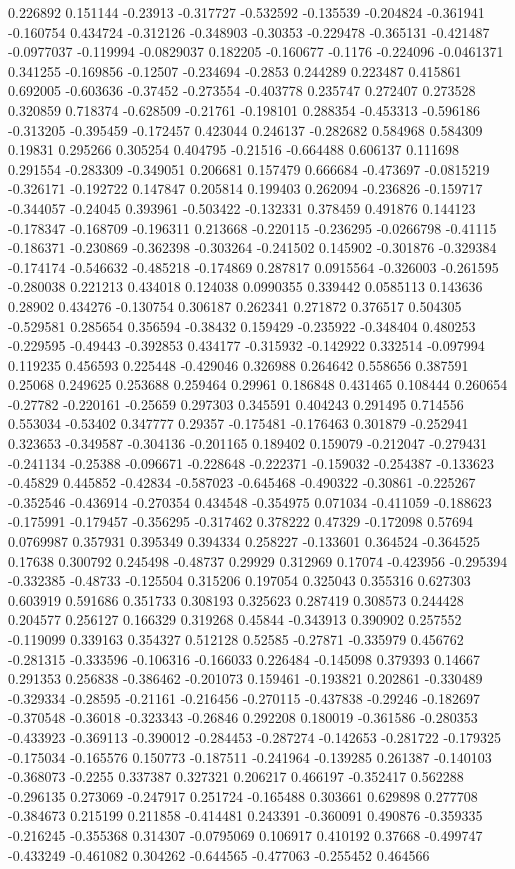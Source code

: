 0.226892 0.151144 -0.23913 -0.317727 -0.532592 -0.135539 -0.204824 -0.361941 -0.160754 0.434724 -0.312126 -0.348903 -0.30353 -0.229478 -0.365131 -0.421487 -0.0977037 -0.119994 -0.0829037 0.182205 -0.160677 -0.1176 -0.224096 -0.0461371 0.341255 -0.169856 -0.12507 -0.234694 -0.2853 0.244289 0.223487 0.415861 0.692005 -0.603636 -0.37452 -0.273554 -0.403778 0.235747 0.272407 0.273528 0.320859 0.718374 -0.628509 -0.21761 -0.198101 0.288354 -0.453313 -0.596186 -0.313205 -0.395459 -0.172457 0.423044 0.246137 -0.282682 0.584968 0.584309 0.19831 0.295266 0.305254 0.404795 -0.21516 -0.664488 0.606137 0.111698 0.291554 -0.283309 -0.349051 0.206681 0.157479 0.666684 -0.473697 -0.0815219 -0.326171 -0.192722 0.147847 0.205814 0.199403 0.262094 -0.236826 -0.159717 -0.344057 -0.24045 0.393961 -0.503422 -0.132331 0.378459 0.491876 0.144123 -0.178347 -0.168709 -0.196311 0.213668 -0.220115 -0.236295 -0.0266798 -0.41115 -0.186371 -0.230869 -0.362398 -0.303264 -0.241502 0.145902 -0.301876 -0.329384 -0.174174 -0.546632 -0.485218 -0.174869 0.287817 0.0915564 -0.326003 -0.261595 -0.280038 0.221213 0.434018 0.124038 0.0990355 0.339442 0.0585113 0.143636 0.28902 0.434276 -0.130754 0.306187 0.262341 0.271872 0.376517 0.504305 -0.529581 0.285654 0.356594 -0.38432 0.159429 -0.235922 -0.348404 0.480253 -0.229595 -0.49443 -0.392853 0.434177 -0.315932 -0.142922 0.332514 -0.097994 0.119235 0.456593 0.225448 -0.429046 0.326988 0.264642 0.558656 0.387591 0.25068 0.249625 0.253688 0.259464 0.29961 0.186848 0.431465 0.108444 0.260654 -0.27782 -0.220161 -0.25659 0.297303 0.345591 0.404243 0.291495 0.714556 0.553034 -0.53402 0.347777 0.29357 -0.175481 -0.176463 0.301879 -0.252941 0.323653 -0.349587 -0.304136 -0.201165 0.189402 0.159079 -0.212047 -0.279431 -0.241134 -0.25388 -0.096671 -0.228648 -0.222371 -0.159032 -0.254387 -0.133623 -0.45829 0.445852 -0.42834 -0.587023 -0.645468 -0.490322 -0.30861 -0.225267 -0.352546 -0.436914 -0.270354 0.434548 -0.354975 0.071034 -0.411059 -0.188623 -0.175991 -0.179457 -0.356295 -0.317462 0.378222 0.47329 -0.172098 0.57694 0.0769987 0.357931 0.395349 0.394334 0.258227 -0.133601 0.364524 -0.364525 0.17638 0.300792 0.245498 -0.48737 0.29929 0.312969 0.17074 -0.423956 -0.295394 -0.332385 -0.48733 -0.125504 0.315206 0.197054 0.325043 0.355316 0.627303 0.603919 0.591686 0.351733 0.308193 0.325623 0.287419 0.308573 0.244428 0.204577 0.256127 0.166329 0.319268 0.45844 -0.343913 0.390902 0.257552 -0.119099 0.339163 0.354327 0.512128 0.52585 -0.27871 -0.335979 0.456762 -0.281315 -0.333596 -0.106316 -0.166033 0.226484 -0.145098 0.379393 0.14667 0.291353 0.256838 -0.386462 -0.201073 0.159461 -0.193821 0.202861 -0.330489 -0.329334 -0.28595 -0.21161 -0.216456 -0.270115 -0.437838 -0.29246 -0.182697 -0.370548 -0.36018 -0.323343 -0.26846 0.292208 0.180019 -0.361586 -0.280353 -0.433923 -0.369113 -0.390012 -0.284453 -0.287274 -0.142653 -0.281722 -0.179325 -0.175034 -0.165576 0.150773 -0.187511 -0.241964 -0.139285 0.261387 -0.140103 -0.368073 -0.2255 0.337387 0.327321 0.206217 0.466197 -0.352417 0.562288 -0.296135 0.273069 -0.247917 0.251724 -0.165488 0.303661 0.629898 0.277708 -0.384673 0.215199 0.211858 -0.414481 0.243391 -0.360091 0.490876 -0.359335 -0.216245 -0.355368 0.314307 -0.0795069 0.106917 0.410192 0.37668 -0.499747 -0.433249 -0.461082 0.304262 -0.644565 -0.477063 -0.255452 0.464566 